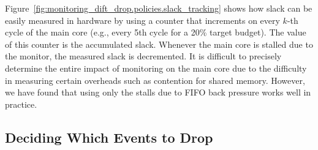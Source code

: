 Figure~\ref{fig:monitoring_dift_drop.policies.slack_tracking} shows how slack
can be easily measured in hardware by using a counter that increments on
every $k$-th cycle of the main core (e.g., every 5th cycle for a 20\% target
budget). The value of this counter is the accumulated slack. Whenever the main
core is stalled due to the monitor, the measured slack is decremented. It is
difficult to precisely determine the entire impact of monitoring on the main
core due to the difficulty in measuring certain overheads such as contention
for shared memory. However, we have found that using only the stalls due to
FIFO back pressure works well in practice.

\subsection{Deciding Which Events to Drop} 
\label{sec:monitoring_dift_drop.policies.which}

